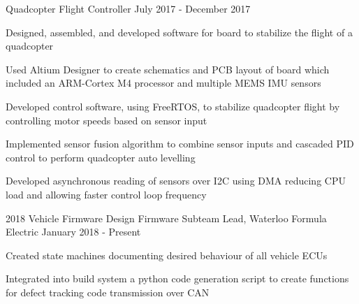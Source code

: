 

\begin{cventries}

  \cventry
    {Quadcopter Flight Controller} %
    {} %
    {} %
    {July 2017 - December 2017} %
    {
      \begin{cvitems} %
        \item {Designed, assembled, and developed software for board to stabilize the flight of a quadcopter}
        \item {Used Altium Designer to create schematics and PCB layout of board which included an ARM-Cortex M4 processor and multiple MEMS IMU sensors}
        \item {Developed control software, using FreeRTOS, to stabilize quadcopter flight by controlling motor speeds based on sensor input}
        \item {Implemented sensor fusion algorithm to combine sensor inputs and cascaded PID control to perform quadcopter auto levelling}
        \item {Developed asynchronous reading of sensors over I2C using DMA reducing CPU load and allowing faster control loop frequency}
      \end{cvitems}
    }

  \cventrytwo
    {2018 Vehicle Firmware Design} %
    {Firmware Subteam Lead, Waterloo Formula Electric} %
    {} %
    {January 2018 - Present} %
    {
      \begin{cvitems}
        \item {Created state machines documenting desired behaviour of all vehicle ECUs}
        \item {Integrated into build system a python code generation script to create functions for defect tracking code transmission over CAN}
      \end{cvitems}
    }


\end{cventries}
